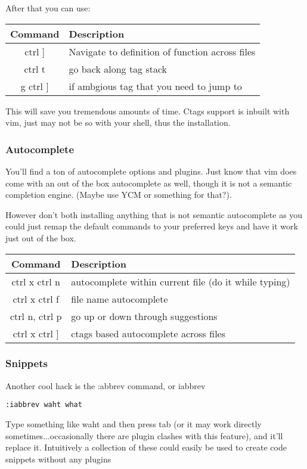 \documentclass[12pt, letterpaper]{article}
\begin{document}
After that you can use:
\begin{table}[H]
    \begin{tabular}{|c|l|}
        Command & Description \\
        \hline
        ctrl ] & Navigate to definition of function across files \\
        \hline
        ctrl t & go back along tag stack \\
        \hline
        g ctrl ] & if ambgious tag that you need to jump to \\
        \hline
    \end{tabular}
\end{table}

This will save you tremendous amounts of time. Ctags support is inbuilt with vim, just may not be so with your shell, thus the installation.

\subsubsection{Autocomplete}
You'll find a ton of autocomplete options and plugins. Just know that vim does come with an out of the box autocomplete as well, though it is not a semantic completion engine. (Maybe use YCM or something for that?).

However don't both installing anything that is not semantic autocomplete as you could just remap the default commands to your preferred keys and have it work just out of the box.
\begin{table}[H]
    \begin{tabular}{|c|l|}
        Command & Description \\
        \hline
        ctrl x ctrl n & autocomplete within current file (do it while typing) \\
        \hline
        ctrl x ctrl f & file name autocomplete \\
        \hline
        ctrl n, ctrl p & go up or down through suggestions \\
        \hline
        ctrl x ctrl ] & ctags based autocomplete across files \\
        \hline
    \end{tabular}
\end{table}

\subsubsection{Snippets}
Another cool hack is the :abbrev command, or iabbrev
\begin{verbatim}
:iabbrev waht what
\end{verbatim}
    Type something like waht and then press tab (or it may work directly sometimes...occasionally there are plugin clashes with this feature), and it'll replace it.
    Intuitively a collection of these could easily be used to create code snippets without any plugins
\end{document}
